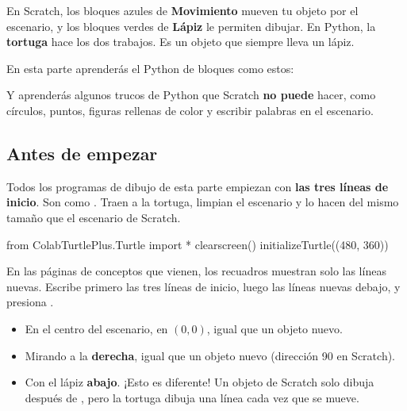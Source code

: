 
En Scratch, los bloques azules de \textbf{Movimiento} mueven tu objeto por el escenario, y los bloques verdes de \textbf{Lápiz} le permiten dibujar. En Python, la \textbf{tortuga} hace los dos trabajos. Es un objeto que siempre lleva un lápiz.

En esta parte aprenderás el Python de bloques como estos:

{\raggedright {}            \par}

Y aprenderás algunos trucos de Python que Scratch \textbf{no puede} hacer, como círculos, puntos, figuras rellenas de color y escribir palabras en el escenario.

\subsection*{Antes de empezar}

Todos los programas de dibujo de esta parte empiezan con \textbf{las tres líneas de inicio}. Son como . Traen a la tortuga, limpian el escenario y lo hacen del mismo tamaño que el escenario de Scratch.

\begin{typethis}
from ColabTurtlePlus.Turtle import *
clearscreen()
initializeTurtle((480, 360))
\end{typethis}

En las páginas de conceptos que vienen, los recuadros muestran solo las líneas nuevas. Escribe primero las tres líneas de inicio, luego las líneas nuevas debajo, y presiona \playbtn.

\begin{think}
\begin{itemize}
  \item En el centro del escenario, en $(0, 0)$, igual que un objeto nuevo.
  \item Mirando a la \textbf{derecha}, igual que un objeto nuevo (dirección 90 en Scratch).
  \item Con el lápiz \textbf{abajo}. ¡Esto es diferente! Un objeto de Scratch solo dibuja después de , pero la tortuga dibuja una línea cada vez que se mueve.
\end{itemize}
\end{think}

